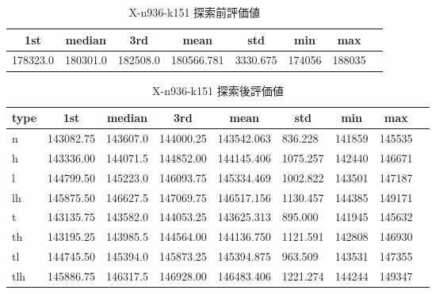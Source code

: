 \begin{table}[htbp]
    \caption{X-n936-k151 探索前評価値}
    \begin{tabular}{|l|l|l|l|l|l|l|l|}\hline
    \multicolumn{1}{|c|}{\textbf{1st}}
    &\multicolumn{1}{c|}{\textbf{median}}
    &\multicolumn{1}{c|}{\textbf{3rd}}
    &\multicolumn{1}{c|}{\textbf{mean}}
    &\multicolumn{1}{c|}{\textbf{std}}
    &\multicolumn{1}{c|}{\textbf{min}}
    &\multicolumn{1}{c|}{\textbf{max}}\\\hline
	178323.0 & 180301.0 & 182508.0 & 180566.781 & 3330.675 & 174056 & 188035\\\hline
	\end{tabular}
\end{table}
\begin{table}[htbp]
    \caption{X-n936-k151 探索後評価値}
    \begin{tabular}{|l|l|l|l|l|l|l|l|l|}\hline
    \multicolumn{1}{|c|}{\textbf{type}}
    &\multicolumn{1}{|c|}{\textbf{1st}}
    &\multicolumn{1}{c|}{\textbf{median}}
    &\multicolumn{1}{c|}{\textbf{3rd}}
    &\multicolumn{1}{c|}{\textbf{mean}}
    &\multicolumn{1}{c|}{\textbf{std}}
    &\multicolumn{1}{c|}{\textbf{min}}
    &\multicolumn{1}{c|}{\textbf{max}}\\\hline
	n & 143082.75 & 143607.0 & 144000.25 & 143542.063 & 836.228 & 141859 & 145535\\\hline
	h & 143336.00 & 144071.5 & 144852.00 & 144145.406 & 1075.257 & 142440 & 146671\\\hline
	l & 144799.50 & 145223.0 & 146093.75 & 145334.469 & 1002.822 & 143501 & 147187\\\hline
	lh & 145875.50 & 146627.5 & 147069.75 & 146517.156 & 1130.457 & 144385 & 149171\\\hline
	t & 143135.75 & 143582.0 & 144053.25 & 143625.313 & 895.000 & 141945 & 145632\\\hline
	th & 143195.25 & 143985.5 & 144564.00 & 144136.750 & 1121.591 & 142808 & 146930\\\hline
	tl & 144745.50 & 145394.0 & 145873.25 & 145394.875 & 963.509 & 143531 & 147355\\\hline
	tlh & 145886.75 & 146317.5 & 146928.00 & 146483.406 & 1221.274 & 144244 & 149347\\\hline
	\end{tabular}
\end{table}
